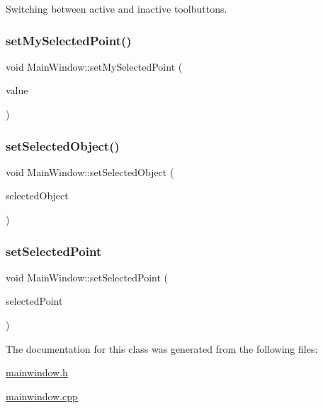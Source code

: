 Switching between active and inactive toolbuttons. 

\mbox{\label{class_main_window_aa19b7a63d9094a1984a4744041feb62a}} 
\subsubsection{\texorpdfstring{set\+My\+Selected\+Point()}{setMySelectedPoint()}}
{\footnotesize\ttfamily void Main\+Window\+::set\+My\+Selected\+Point (\begin{DoxyParamCaption}\item[{Q\+PointF $\ast$}]{value }\end{DoxyParamCaption})}

\mbox{\label{class_main_window_a6ec62901bdc71edb074b5b3dc8caf407}} 
\subsubsection{\texorpdfstring{set\+Selected\+Object()}{setSelectedObject()}}
{\footnotesize\ttfamily void Main\+Window\+::set\+Selected\+Object (\begin{DoxyParamCaption}\item[{\hyperlink{class_graphics_object}{Graphics\+Object} $\ast$}]{selected\+Object }\end{DoxyParamCaption})}

\mbox{\label{class_main_window_aeeedb3580798df598118c8ba5cc00bdc}} 
\subsubsection{\texorpdfstring{set\+Selected\+Point}{setSelectedPoint}}
{\footnotesize\ttfamily void Main\+Window\+::set\+Selected\+Point (\begin{DoxyParamCaption}\item[{Q\+PointF}]{selected\+Point }\end{DoxyParamCaption})\hspace{0.3cm}{\ttfamily [slot]}}



The documentation for this class was generated from the following files\+:\begin{DoxyCompactItemize}
\item 
\hyperlink{mainwindow_8h}{mainwindow.\+h}\item 
\hyperlink{mainwindow_8cpp}{mainwindow.\+cpp}\end{DoxyCompactItemize}
